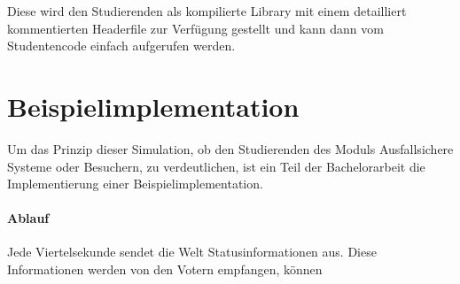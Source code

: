 Diese wird den Studierenden als kompilierte Library mit einem detailliert kommentierten Headerfile zur Verf{\"{u}}gung gestellt und kann
dann vom Studentencode einfach aufgerufen werden.


\clearpage
\section{Beispielimplementation}
Um das Prinzip dieser Simulation, ob den Studierenden des Moduls Ausfallsichere Systeme oder Besuchern, zu verdeutlichen, ist ein Teil der Bachelorarbeit die Implementierung einer
Beispielimplementation.

\paragraph{Ablauf} Jede Viertelsekunde sendet die Welt Statusinformationen aus. Diese Informationen werden von den Votern empfangen, k{\"{o}}nnen
